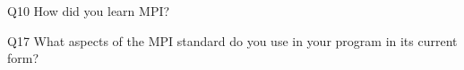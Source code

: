 \begin{description}%
\item{Q10} How did you learn MPI?%
\item{Q17} What aspects of the MPI standard do you use in your program in its current form?%
\end{description}%
